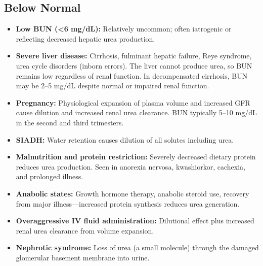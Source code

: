 \subsection*{Below Normal}
\begin{itemize}
  \item \textbf{Low BUN (<6 mg/dL):} Relatively uncommon; often iatrogenic or reflecting decreased hepatic urea production.
  \item \textbf{Severe liver disease:} Cirrhosis, fulminant hepatic failure, Reye syndrome, urea cycle disorders (inborn errors). The liver cannot produce urea, so BUN remains low regardless of renal function. In decompensated cirrhosis, BUN may be 2--5 mg/dL despite normal or impaired renal function.
  \item \textbf{Pregnancy:} Physiological expansion of plasma volume and increased GFR cause dilution and increased renal urea clearance. BUN typically 5--10 mg/dL in the second and third trimesters.
  \item \textbf{SIADH:} Water retention causes dilution of all solutes including urea.
  \item \textbf{Malnutrition and protein restriction:} Severely decreased dietary protein reduces urea production. Seen in anorexia nervosa, kwashiorkor, cachexia, and prolonged illness.
  \item \textbf{Anabolic states:} Growth hormone therapy, anabolic steroid use, recovery from major illness---increased protein synthesis reduces urea generation.
  \item \textbf{Overaggressive IV fluid administration:} Dilutional effect plus increased renal urea clearance from volume expansion.
  \item \textbf{Nephrotic syndrome:} Loss of urea (a small molecule) through the damaged glomerular basement membrane into urine.
\end{itemize}

